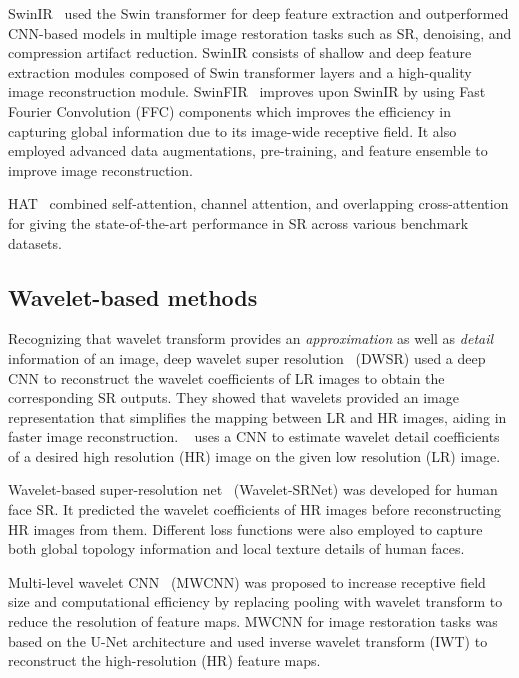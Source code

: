 \documentclass{article}
\begin{document}
SwinIR~\cite{liang2021swinir} used the Swin transformer for deep feature extraction and outperformed CNN-based models in multiple image restoration tasks such as SR, denoising, and compression artifact reduction.  SwinIR consists of shallow and deep feature extraction modules composed of Swin transformer layers and a high-quality image reconstruction module. SwinFIR~\cite{zhang2023swinfir} improves upon SwinIR by using Fast Fourier Convolution (FFC) components which improves the efficiency in capturing global information due to its image-wide receptive field. It also employed advanced data augmentations, pre-training, and feature ensemble to improve image reconstruction.

HAT~\cite{Chen_2023_CVPR} combined self-attention, channel attention, and overlapping cross-attention for giving the state-of-the-art performance in SR across various benchmark datasets.

\subsection{Wavelet-based methods}

Recognizing that wavelet transform provides an \emph{approximation} as well as \emph{detail} information of an image, deep wavelet super resolution~\cite{8014882} (DWSR) used a deep CNN to reconstruct the wavelet coefficients of LR images to obtain the corresponding SR outputs. They showed that wavelets provided an image representation that simplifies the mapping between LR and HR images, aiding in faster image reconstruction. ~\cite{kumar2017convolutional} uses a CNN to estimate wavelet detail coefficients of a desired high resolution (HR) image  on the given low resolution (LR) image.  

Wavelet-based super-resolution net~\cite{8237449} (Wavelet-SRNet) was developed for human face SR. It predicted the wavelet coefficients of HR images before reconstructing HR images from them. Different loss functions were also employed to capture both global topology information and local texture details of human faces.

Multi-level wavelet CNN~\cite{liu2019multilevel} (MWCNN) was proposed to increase receptive field size and computational efficiency by replacing pooling with wavelet transform to reduce the resolution of feature maps. MWCNN for image restoration tasks was based on the U-Net architecture and used inverse wavelet transform (IWT) to reconstruct the high-resolution (HR) feature maps. 
\end{document}
